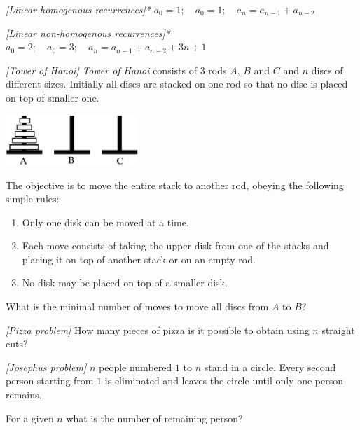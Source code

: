 \begin{problem}
\textit{[Linear homogenous recurrences]*}
$
a_0=1; \quad
a_0=1; \quad
a_n=a_{n-1}+a_{n-2}
$
\end{problem}
%

\begin{problem}
\textit{[Linear non-homogenous recurrences]*}
$
a_0=2; \quad
a_0=3; \quad
a_n=a_{n-1}+a_{n-2}+3n+1
$
\end{problem}
%

\begin{problem}
\textit{[Tower of Hanoi]}
\textit{Tower of Hanoi} consists of $3$ rods $A$, $B$ and $C$ and $n$ discs of different sizes. Initially all discs are stacked on one rod so that no disc is placed on top of smaller one.
\begin{center}
\includegraphics[width=5cm]{TowersOfHanoiFigure.jpg}
\label{fig:Hanoi}
\end{center}
The objective is to move the entire stack to another rod, obeying the following simple rules:
\begin{enumerate}
\item Only one disk can be moved at a time.
\item Each move consists of taking the upper disk from one of the stacks and placing it on top of another stack or on an empty rod.
\item No disk may be placed on top of a smaller disk.
\end{enumerate}
What is the minimal number of moves to move all discs from $A$ to $B$?
\end{problem}
%

\begin{problem}
\textit{[Pizza problem]}
How many pieces of pizza is it possible to obtain using $n$ straight cuts?
\end{problem}
%

\begin{problem}
\textit{[Josephus problem]}
$n$ people numbered $1$ to $n$ stand in a circle. Every second person starting from $1$ is eliminated and leaves the circle until only one person remains. 

For a given $n$ what is the number of remaining person?
\end{problem}
%


